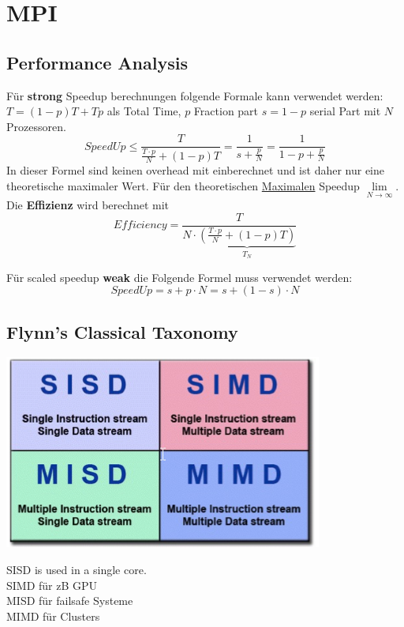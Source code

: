 \section{MPI}

\subsection{Performance Analysis}
Für \textbf{strong} Speedup berechnungen folgende Formale kann verwendet werden:
$T = (1-p)T + Tp$ als Total Time, $p$ Fraction part $s = 1 -p$ serial Part mit $N$ Prozessoren.
\[
SpeedUp \leq \frac{T}{\frac{T\cdot p}{N} + (1-p)T} = \frac{1}{s + \frac{p}{N}}= \frac{1}{1-p + \frac{p}{N}}
\]
In dieser Formel sind keinen overhead mit einberechnet und ist daher nur eine theoretische maximaler Wert. Für den theoretischen \underline{Maximalen} Speedup $\lim\limits_{N\rightarrow\infty}$. Die \textbf{Effizienz} wird berechnet mit
\[
Efficiency = \frac{T}{N \cdot \underbrace{\left(\frac{T\cdot p}{N} + (1 - p)T\right)}_{T_N}}
\]

Für scaled speedup \textbf{weak} die Folgende Formel muss verwendet werden:
\[
SpeedUp = s + p\cdot N = s + (1-s)\cdot N
\]

\subsection{Flynn's Classical Taxonomy}
\noindent\begin{minipage}{\textwidth}
	\begin{minipage}{0.25\textwidth}
		\includegraphics[width=\linewidth,keepaspectratio=true]{Images/flynn}
	\end{minipage}%
	\begin{minipage}{0.2\textwidth}
		SISD is used in a single core.\\
		SIMD für zB GPU\\
		MISD für failsafe Systeme\\
		MIMD für Clusters
	\end{minipage}
\end{minipage}

